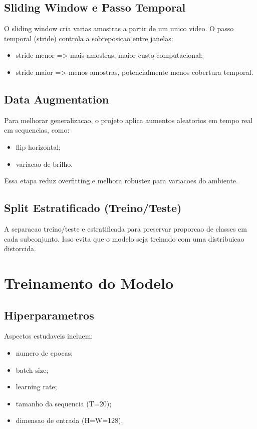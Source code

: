 \subsection{Sliding Window e Passo Temporal}
O sliding window cria varias amostras a partir de um unico video. O passo temporal (stride) controla a sobreposicao entre janelas:
\begin{itemize}
  \item stride menor => mais amostras, maior custo computacional;
  \item stride maior => menos amostras, potencialmente menos cobertura temporal.
\end{itemize}

\subsection{Data Augmentation}
Para melhorar generalizacao, o projeto aplica aumentos aleatorios em tempo real em sequencias, como:
\begin{itemize}
  \item flip horizontal;
  \item variacao de brilho.
\end{itemize}
Essa etapa reduz overfitting e melhora robustez para variacoes do ambiente.

\subsection{Split Estratificado (Treino/Teste)}
A separacao treino/teste e estratificada para preservar proporcao de classes em cada subconjunto. Isso evita que o modelo seja treinado com uma distribuicao distorcida.

\section{Treinamento do Modelo}

\subsection{Hiperparametros}
Aspectos estudaveis incluem:
\begin{itemize}
  \item numero de epocas;
  \item batch size;
  \item learning rate;
  \item tamanho da sequencia (T=20);
  \item dimensao de entrada (H=W=128).
\end{itemize}

